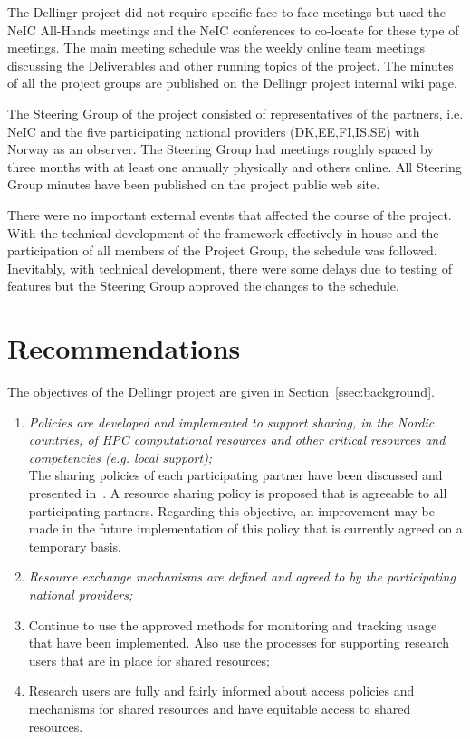 \documentclass{article}
\newcommand{\dell}{Dellingr\xspace}
\begin{document}
The \dell project did not require specific face-to-face meetings but used the NeIC All-Hands meetings and the NeIC conferences
to co-locate for these type of meetings.
The main meeting schedule was the weekly online team meetings discussing the Deliverables and other running topics of the project.
The minutes of all the project groups are published on the \dell project internal wiki page.

The Steering Group of the project consisted of representatives of the partners, i.e. NeIC and the five participating national providers
(DK,EE,FI,IS,SE) with Norway as an observer.
The Steering Group had meetings roughly spaced by three months with at least one annually physically and others online.
All Steering Group minutes have been published on the project public web site.

There were no important external events that affected the course of the project.
With the technical development of the framework effectively in-house and the participation
of all members of the Project Group, the schedule was followed.
Inevitably, with technical development, there were some delays due to testing of features but
the Steering Group approved the changes to the schedule.

\section{Recommendations}

The objectives of the \dell project are given in Section~\ref{ssec:background}.

\begin{enumerate}
\item {\it Policies are developed and implemented to support sharing, in the Nordic countries, of HPC computational resources and other critical resources and competencies (e.g. local support);}\\
{
The sharing policies of each participating partner have been discussed and presented in~\cite{dellingr-p2-do5}.
A resource sharing policy is proposed that is agreeable to all participating partners.
Regarding this objective, an improvement may be made in the future implementation of this policy that is currently agreed on a temporary basis.
}

\item {\it Resource exchange mechanisms are defined and agreed to by the participating national providers;}
\item Continue to use the approved methods for monitoring and tracking usage that have been implemented. Also use the processes for supporting research users that are in place for shared resources;
\item Research users are fully and fairly informed about access policies and mechanisms for shared resources and have equitable 
access to shared resources.
\end{enumerate}
\end{document}

